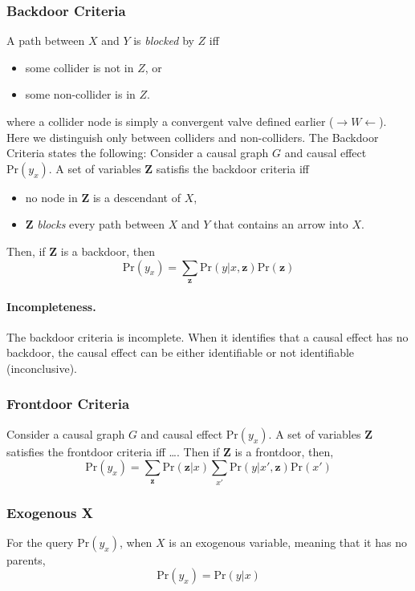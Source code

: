 \documentclass[11pt]{article}
\newcommand{\bz}{\mathbf{z}}
\newcommand{\pr}{\mathrm{Pr}}
\begin{document}
\subsubsection{Backdoor Criteria}
A path between $X$ and $Y$ is \textit{\color{Thistle} blocked} by $Z$ iff 
\begin{itemize}
	\item some collider is not in $Z$, or
	\item some non-collider is in $Z$. 
\end{itemize}
where a collider node is simply a convergent valve defined earlier ($\rightarrow W \leftarrow$). Here we distinguish only between colliders and non-colliders. The Backdoor Criteria states the following: Consider a causal graph $G$ and causal effect $\pr(y_x)$. A set of variables $\mathbf Z$ satisfis the backdoor criteria iff 
\begin{itemize}
	\item no node in $\mathbf Z$ is a descendant of $X$, 
	\item $\mathbf Z$ \textit{\color{Thistle} blocks} every path between $X$ and $Y$ that contains an arrow into $X$. 
\end{itemize}
Then, if $\mathbf Z$ is a backdoor, then
\begin{equation}
	\pr ( y _ x) = \sum_{\bz} \pr (y | x, \bz) \pr (\bz)
\end{equation}

\paragraph{Incompleteness.} The backdoor criteria is incomplete. When it identifies that a causal effect has no backdoor, the causal effect can be either identifiable or not identifiable (inconclusive).  


\subsubsection{Frontdoor Criteria}
Consider a causal graph $G$ and causal effect $\pr(y_x)$. A set of variables $\mathbf Z$ satisfies the frontdoor criteria iff \dots. Then if $\mathbf Z$ is a frontdoor, then, 
\begin{equation}
	\pr ( y _ x ) = \sum _ \bz \pr (\bz | x ) \sum_{x'} \pr(y | x', \bz ) \pr(x')
\end{equation}

\subsubsection{Exogenous X\label{sec:exox}}
For the query $\pr (y_x)$, when $X$ is an exogenous variable, meaning that it has no parents, 
\begin{equation}
	\pr(y _x) = \pr ( y | x)
\end{equation}
\end{document}
